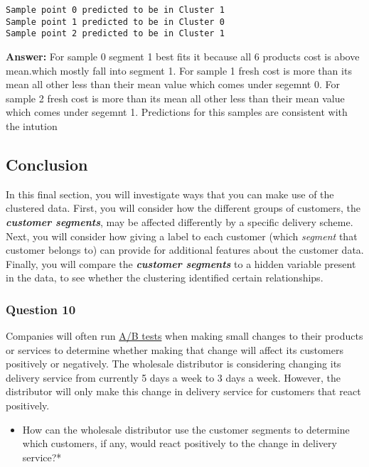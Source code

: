 \documentclass[11pt]{article}
\providecommand{\tightlist}{%
      \setlength{\itemsep}{0pt}\setlength{\parskip}{0pt}}
\begin{document}
    \begin{Verbatim}[commandchars=\\\{\}]
Sample point 0 predicted to be in Cluster 1
Sample point 1 predicted to be in Cluster 0
Sample point 2 predicted to be in Cluster 1

    \end{Verbatim}

    \textbf{Answer:} For sample 0 segment 1 best fits it because all 6
products cost is above mean.which mostly fall into segment 1. For sample
1 fresh cost is more than its mean all other less than their mean value
which comes under segemnt 0. For sample 2 fresh cost is more than its
mean all other less than their mean value which comes under segemnt 1.
Predictions for this samples are consistent with the intution

    \subsection{Conclusion}\label{conclusion}

    In this final section, you will investigate ways that you can make use
of the clustered data. First, you will consider how the different groups
of customers, the \textbf{\emph{customer segments}}, may be affected
differently by a specific delivery scheme. Next, you will consider how
giving a label to each customer (which \emph{segment} that customer
belongs to) can provide for additional features about the customer data.
Finally, you will compare the \textbf{\emph{customer segments}} to a
hidden variable present in the data, to see whether the clustering
identified certain relationships.

    \subsubsection{Question 10}\label{question-10}

Companies will often run
\href{https://en.wikipedia.org/wiki/A/B_testing}{A/B tests} when making
small changes to their products or services to determine whether making
that change will affect its customers positively or negatively. The
wholesale distributor is considering changing its delivery service from
currently 5 days a week to 3 days a week. However, the distributor will
only make this change in delivery service for customers that react
positively.

\begin{itemize}
\tightlist
\item
  How can the wholesale distributor use the customer segments to
  determine which customers, if any, would react positively to the
  change in delivery service?*
\end{itemize}
\end{document}
